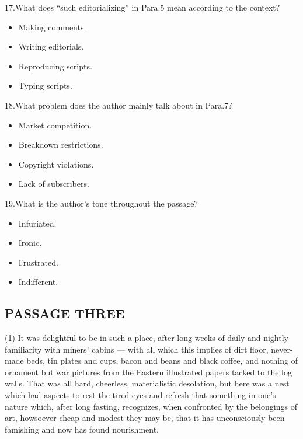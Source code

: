 \documentclass[UTF8,11pt]{ctexart}
\begin{document}
17.What does “such editorializing” in Para.5 mean according to the context?


\begin{itemize}[leftmargin=2em,itemsep=.2em,topsep=.4em]\item[A.] Making comments.
\item[B.] Writing editorials.
\item[C.] Reproducing scripts.
\item[D.] Typing scripts.
\end{itemize}

18.What problem does the author mainly talk about in Para.7?


\begin{itemize}[leftmargin=2em,itemsep=.2em,topsep=.4em]\item[A.] Market competition.
\item[B.] Breakdown restrictions.
\item[C.] Copyright violations.
\item[D.] Lack of subscribers.
\end{itemize}

19.What is the author’s tone throughout the passage?


\begin{itemize}[leftmargin=2em,itemsep=.2em,topsep=.4em]\item[A.] Infuriated.
\item[B.] Ironic.
\item[C.] Frustrated.
\item[D.] Indifferent.
\end{itemize}

\subsection*{\textbf{PASSAGE THREE}}


(1) It was delightful to be in such a place, after long weeks of daily and nightly familiarity with miners’ cabins — with all which this implies of dirt floor, never-made beds, tin plates and cups, bacon and beans and black coffee, and nothing of ornament but war pictures from the Eastern illustrated papers tacked to the log walls. That was all hard, cheerless, materialistic desolation, but here was a nest which had aspects to rest the tired eyes and refresh that something in one’s nature which, after long fasting, recognizes, when confronted by the belongings of art, howsoever cheap and modest they may be, that it has unconsciously been famishing and now has found nourishment.
\end{document}

